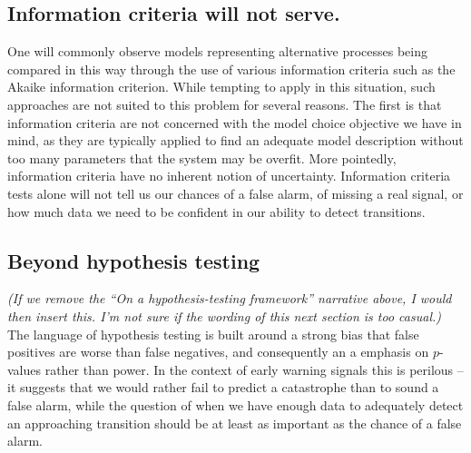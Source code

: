 \documentclass[authoryear,preprint,11pt]{elsarticle}
\newcommand{\cb}[1]{{\it \color{darkgreen} (#1)}}
\begin{document}
\subsection{Information criteria will not serve.}
One will commonly observe models representing alternative processes being compared in this way through 
the use of various information criteria such as the Akaike information criterion.  
While tempting to apply in this situation, such approaches are not suited to this problem for several reasons.  
The first is that information criteria are not concerned with the model choice objective we have in mind,
as they are typically applied to find an adequate model description without too many parameters that the system may be overfit.  
More pointedly, information criteria have no inherent notion of uncertainty.
Information criteria tests alone will not tell us our chances of a false alarm, of missing a real signal, 
or how much data we need to be confident in our ability to detect transitions.   

\subsection{Beyond hypothesis testing}
\cb{If we remove the ``On a hypothesis-testing framework'' narrative above, I would then insert this.  I'm not sure if the wording of this next section is too casual.}
The language of hypothesis testing is built around a strong bias that false positives are worse than false negatives, 
and consequently an a emphasis on $p$-values rather than power.  
In the context of early warning signals this is perilous -- 
it suggests that we would rather fail to predict a catastrophe than to sound a false alarm, 
while the question of when we have enough data to adequately detect an approaching transition
should be at least as important as the chance of a false alarm.  
\end{document}
